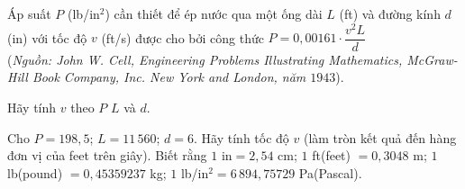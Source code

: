 \begin{bt}%
	Áp suất $P$ (lb/in$^2$) cần thiết để ép nước qua một ống dài $L$ (ft) và đường kính $d$ (in) với tốc độ $v$ (ft/s) được cho bởi công thức $P=0{,}00161 \cdot \dfrac{v^2 L}{d}$\\
	(\textit{Nguồn: John W. Cell, Engineering Problems Illustrating Mathematics, McGraw-Hill Book Company, Inc. New York and London, năm $1943$}).
	\begin{listEX}
	\item Hãy tính $v$ theo $P$ $L$ và $d$.
	\item Cho $P=198{,}5 $; $L=11\, 560 $; $d=6$. Hãy tính tốc độ $v$ (làm tròn kết quả đến hàng đơn vị của feet trên giây).
	Biết rằng $1$ in$=2{,}54$ cm; $1$ ft(feet) $=0{,}3048$ m; $1$ lb(pound) $=0{,}45359237 $ kg; $1$ lb/in$^2=6\, 894{,}75729$ Pa(Pascal).
	\end{listEX}
\end{bt}
